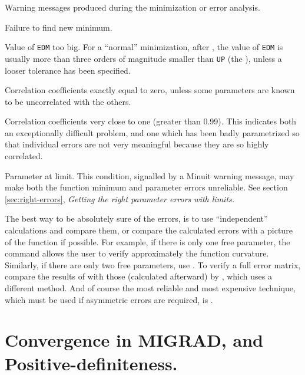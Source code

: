 \begin{UL}
\item Warning messages produced during the minimization or error analysis.
\item Failure to find new minimum.
\item Value of \texttt{EDM} too big. For a ``normal'' minimization, 
      after , the value of \texttt{EDM} is usually more 
      than three orders of magnitude smaller than \texttt{UP} 
      (the ), unless a looser tolerance has been specified.
\item Correlation coefficients exactly equal to zero, unless some parameters
      are known to be uncorrelated with the others.
\item Correlation coefficients very close to one (greater than 0.99).
      This indicates both an exceptionally difficult problem, and one
      which has been badly parametrized so that individual errors are not
      very meaningful because they are so highly correlated.
\item Parameter at limit. This condition, signalled by a Minuit warning
      message, may make both the function minimum and parameter errors
      unreliable. See section \ref{sec:right-errors},
      {\em Getting the right parameter errors with limits.}
\end{UL}

The best way to be absolutely sure of the errors, is to use
``independent'' calculations and compare them, or compare the calculated
errors with a picture of the function if possible.
For example, if there is only one free parameter, the command 
allows the user to verify approximately the function curvature.
Similarly, if there are only two free parameters, use .
To verify a full error matrix, compare the results of 
with those (calculated afterward) by , 
which uses a different method.
And of course the most reliable and most expensive technique,
which must be used if asymmetric errors are required, is .

\section{Convergence in MIGRAD, and Positive-definiteness.}

